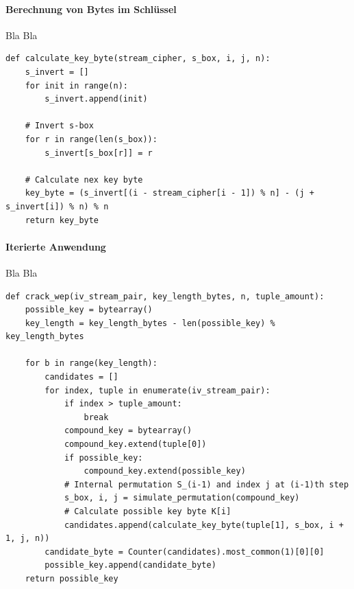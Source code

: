 \documentclass[10pt,a4paper]{article}
\begin{document}
\paragraph{Berechnung von Bytes im Schlüssel} Bla Bla
\begin{lstlisting}
def calculate_key_byte(stream_cipher, s_box, i, j, n):
    s_invert = []
    for init in range(n):
        s_invert.append(init)

    # Invert s-box
    for r in range(len(s_box)):
        s_invert[s_box[r]] = r

    # Calculate nex key byte
    key_byte = (s_invert[(i - stream_cipher[i - 1]) % n] - (j + s_invert[i]) % n) % n
    return key_byte
\end{lstlisting}
\paragraph{Iterierte Anwendung} Bla Bla
\begin{lstlisting}
def crack_wep(iv_stream_pair, key_length_bytes, n, tuple_amount):
    possible_key = bytearray()
    key_length = key_length_bytes - len(possible_key) % key_length_bytes

    for b in range(key_length):
        candidates = []
        for index, tuple in enumerate(iv_stream_pair):
            if index > tuple_amount:
                break
            compound_key = bytearray()
            compound_key.extend(tuple[0])
            if possible_key:
                compound_key.extend(possible_key)
            # Internal permutation S_(i-1) and index j at (i-1)th step
            s_box, i, j = simulate_permutation(compound_key)
            # Calculate possible key byte K[i]
            candidates.append(calculate_key_byte(tuple[1], s_box, i + 1, j, n))
        candidate_byte = Counter(candidates).most_common(1)[0][0]
        possible_key.append(candidate_byte)
    return possible_key
\end{lstlisting}
\end{document}
